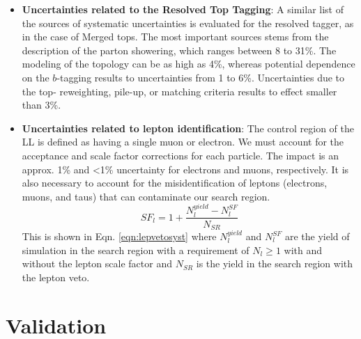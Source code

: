 \begin{itemize}
	\item \textbf{Uncertainties related to the Resolved Top Tagging}: A similar list of the sources of systematic uncertainties is evaluated for the resolved tagger, as in the case of Merged tops. The most important sources stems from the description of the parton showering, which ranges between 8 to 31\%. The modeling of the \ttbar{} topology can be as high as 4\%, whereas potential dependence on the $b$-tagging results to uncertainties from 1 to 6\%. Uncertainties due to the top-\pt{} reweighting, pile-up, or matching criteria results to effect smaller than 3\%. 
	\item \textbf{Uncertainties related to lepton identification}: The control region of the LL is defined as having a single muon or electron. We must account for the acceptance and scale factor corrections for each particle. The impact is an approx. 1\%  and <1\% uncertainty for electrons and muons, respectively. It is also necessary to account for the misidentification of leptons (electrons, muons, and taus) that can contaminate our search region. 
	\begin{equation}\label{eqn:lepvetosyst}
		SF_{l}=1+\frac{N_l^{yield}-N_l^{SF}}{N_{SR}}
	\end{equation}
	This is shown in Eqn. \ref{eqn:lepvetosyst} where $N_l^{yield}$ and $N_l^{SF}$ are  the yield of simulation in the search region with a requirement of $N_l\geq1$ with and without the lepton scale factor and $N_{SR}$ is the yield in the search region with the lepton veto.  
\end{itemize}

\section{Validation}\label{sec:Validation}



